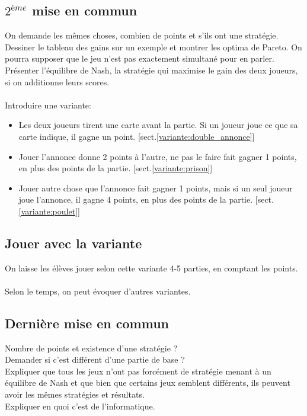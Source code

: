 \documentclass{article}
\begin{document}
\subsection{$2^{ème}$ mise en commun}
On demande les mêmes choses, combien de points et s'ils ont une stratégie.\\
Dessiner le tableau des gains sur un exemple et montrer les optima de Pareto. On pourra supposer que le jeu n'est pas exactement simultané pour en parler. Présenter l'équilibre de Nash, la stratégie qui maximise le gain des deux joueurs, si on additionne leurs scores.
\\
\\
Introduire une variante: 
\begin{itemize}
    \item Les deux joueurs tirent une carte avant la partie. Si un joueur joue ce que sa carte indique, il gagne un point. [sect.\ref{variante:double_annonce}]
    \item Jouer l'annonce donne 2 points à l'autre, ne pas le faire fait gagner 1 points, en plus des points de la partie. [sect.\ref{variante:prison}]
    \item Jouer autre chose que l'annonce fait gagner 1 points, mais si un seul joueur joue l'annonce, il gagne 4 points, en plus des points de la partie. [sect.\ref{variante:poulet}] 
\end{itemize}
\subsection{Jouer avec la variante}
On laisse les élèves jouer selon cette variante 4-5 parties, en comptant les points. 
\\
\\
Selon le temps, on peut évoquer d'autres variantes.

\subsection{Dernière mise en commun}
Nombre de points et existence d'une stratégie ? \\
Demander si c'est différent d'une partie de base ? \\
Expliquer que tous les jeux n'ont pas forcément de stratégie menant à un équilibre de Nash et que bien que certains jeux semblent différents, ils peuvent avoir les mêmes stratégies et résultats.\\
Expliquer en quoi c'est de l'informatique.
\end{document}
